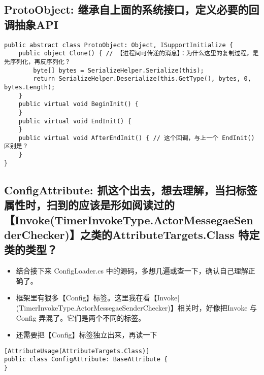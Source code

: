 \documentclass[9pt, b5paper]{article}
\begin{document}
\subsection{ProtoObject: 继承自上面的系统接口，定义必要的回调抽象API}
\label{sec-8-2}
\begin{verbatim}
public abstract class ProtoObject: Object, ISupportInitialize {
    public object Clone() { // 【进程间可传递的消息】：为什么这里的复制过程，是先序列化，再反序列化？
        byte[] bytes = SerializeHelper.Serialize(this);
        return SerializeHelper.Deserialize(this.GetType(), bytes, 0, bytes.Length);
    }
    public virtual void BeginInit() {
    }
    public virtual void EndInit() {
    }
    public virtual void AfterEndInit() { // 这个回调，与上一个 EndInit() 区别是？
    }
}
\end{verbatim}
\subsection{ConfigAttribute: 抓这个出去，想去理解，当扫标签属性时，扫到的应该是形如阅读过的【Invoke(TimerInvokeType.ActorMessegaeSenderChecker)】之类的AttributeTargets.Class 特定类的类型？}
\label{sec-8-3}
\begin{itemize}
\item 结合接下来 ConfigLoader.cs 中的源码，多想几遍或查一下，确认自己理解正确了。
\item 框架里有狠多【Config】标签。这里我在看【Invoke|(TimerInvokeType.ActorMessegaeSenderChecker)】相关时，好像把Invoke 与Config 弄混了。它们是两个不同的标签。
\item 还需要把【Config】标签独立出来，再读一下
\end{itemize}
\begin{verbatim}
[AttributeUsage(AttributeTargets.Class)]
public class ConfigAttribute: BaseAttribute {
}
\end{verbatim}
\end{document}
